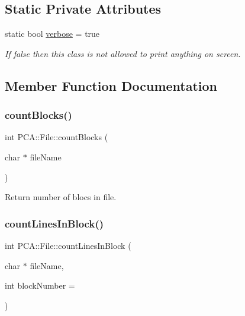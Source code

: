 \subsection*{Static Private Attributes}
\begin{DoxyCompactItemize}
\item 
static bool \hyperlink{class_p_c_a_1_1_file_a7d78765563f9be7e1ca260dcd3c65053}{verbose} = true
\begin{DoxyCompactList}\small\item\em If false then this class is not allowed to print anything on screen. \end{DoxyCompactList}\end{DoxyCompactItemize}


\subsection{Member Function Documentation}
\hypertarget{class_p_c_a_1_1_file_a25bcd550fcc9e0a948f4c553b330a7a6}{}\label{class_p_c_a_1_1_file_a25bcd550fcc9e0a948f4c553b330a7a6} 
\subsubsection{\texorpdfstring{count\+Blocks()}{countBlocks()}}
{\footnotesize\ttfamily int P\+C\+A\+::\+File\+::count\+Blocks (\begin{DoxyParamCaption}\item[{char $\ast$}]{file\+Name }\end{DoxyParamCaption})\hspace{0.3cm}{\ttfamily [static]}}



Return number of blocs in file. 

\hypertarget{class_p_c_a_1_1_file_a832795e34ab12c9fd127bdf99d89efa3}{}\label{class_p_c_a_1_1_file_a832795e34ab12c9fd127bdf99d89efa3} 
\subsubsection{\texorpdfstring{count\+Lines\+In\+Block()}{countLinesInBlock()}}
{\footnotesize\ttfamily int P\+C\+A\+::\+File\+::count\+Lines\+In\+Block (\begin{DoxyParamCaption}\item[{char $\ast$}]{file\+Name,  }\item[{int}]{block\+Number = {} }\end{DoxyParamCaption})\hspace{0.3cm}{\ttfamily [static]}}



